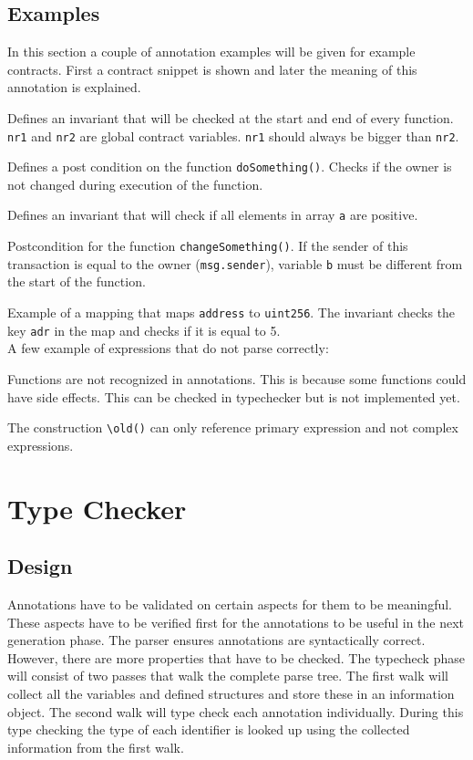 \documentclass[a4paper]{article}
\begin{document}
\subsection{Examples}
In this section a couple of annotation examples will be given for example contracts. First a contract snippet is shown and later the meaning of this annotation is explained.

Defines an invariant that will be checked at the start and end of every function. \texttt{nr1} and \texttt{nr2} are global contract variables. \texttt{nr1} should always be bigger than \texttt{nr2}.

Defines a post condition on the function \texttt{doSomething()}. Checks if the owner is not changed during execution of the function.

Defines an invariant that will check if all elements in array \texttt{a} are positive.

Postcondition for the function \texttt{changeSomething()}. If the sender of this transaction is equal to the owner (\texttt{msg.sender}), variable \texttt{b} must be different from the start of the function. 

Example of a mapping that maps \texttt{address} to \texttt{uint256}. The invariant checks the key \texttt{adr} in the map and checks if it is equal to 5. \hfill\\
A few example of expressions that do not parse correctly:

Functions are not recognized in annotations. This is because some functions could have side effects. This can be checked in typechecker but is not implemented yet.

The construction \texttt{\textbackslash old()} can only reference primary expression and not complex expressions.

\newpage
\section{Type Checker}
\label{sec:typechecker}
\subsection{Design}
Annotations have to be validated on certain aspects for them to be meaningful. These aspects have to be verified first for the annotations to be useful in the next generation phase. The parser ensures annotations are syntactically correct. However, there are more properties that have to be checked. The typecheck phase will consist of two passes that walk the complete parse tree. The first walk will collect all the variables and defined structures and store these in an information object. The second walk will type check each annotation individually. During this type checking the type of each identifier is looked up using the collected information from the first walk. 
\end{document}
